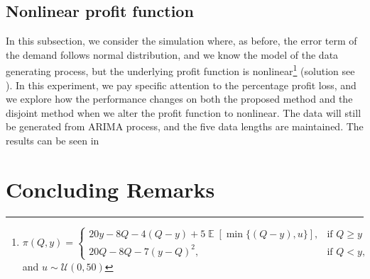 \documentclass{article}
\DeclareMathOperator{\E}{\mathbb{E}}
\begin{document}
\begin{table}[ht]
\caption{Target service level effect on percentage profit loss and service level at 4800 data size}
\label{tab:level_effect4800}
\centering
{}
\end{table}

\subsection{Nonlinear profit function}
In this subsection, we consider the simulation where, as before, the error term of the demand follows normal distribution, and we know the model of the data generating process, but the underlying profit function is nonlinear\footnote{$
        \pi(Q,y)=
        \begin{cases}
            20y-8Q-4(Q-y)+5\E[\min \{(Q-y),u\}],& \text{if } Q\geq y\\
            20Q-8Q-7(y-Q)^2,& \text{if } Q< y,
        \end{cases}$ and $u\sim \mathcal{U}(0,50)$} (solution see \cite{KK18}). 
In this experiment, we pay specific attention to the percentage profit loss, and we explore how the performance changes on both the proposed method and the disjoint method when we alter the profit function to nonlinear. The data will still be generated from ARIMA process, and the five data lengths are maintained. The results can be seen in 

\section{Concluding Remarks} \label{se:end}
\end{document}

